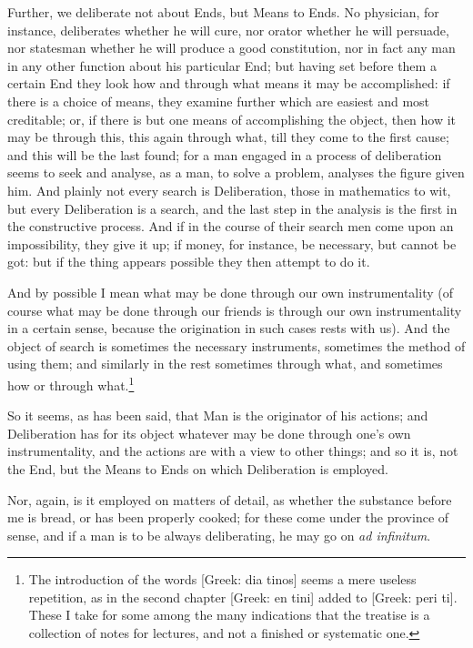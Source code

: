 Further, we deliberate not about Ends, but Means to Ends. No physician, for
instance, deliberates whether he will cure, nor orator whether he will
persuade, nor statesman whether he will produce a good constitution, nor in
fact any man in any other function about his particular End; but having set
before them a certain End they look how and through what means it may be
accomplished: if there is a choice of means, they examine further which are
easiest and most creditable; or, if there is but one means of accomplishing the
object, then how it may be through this, this again through what, till they
come to the first cause; and this will be the last found; for a man engaged in
a process of deliberation seems to seek and analyse, as a man, to solve a
problem, analyses the figure given him. And plainly not every search is
Deliberation, those in mathematics to wit, but every Deliberation is a search,
and the last step in the analysis is the first in the constructive process. And
if in the course of their search men come upon an impossibility, they give it
up; if money, for instance, be necessary, but cannot be got: but if the thing
appears possible they then attempt to do it.

And by possible I mean what may be done through our own instrumentality (of
course what may be done through our friends is through our own instrumentality
in a certain sense, because the origination in such cases rests with us). And
the object of search is sometimes the necessary instruments, sometimes the
method of using them; and similarly in the rest sometimes through what, and
sometimes how or through what.\footnote{The introduction of the words [Greek: dia tinos] seems a mere useless
repetition, as in the second chapter [Greek: en tini] added to [Greek: peri
ti]. These I take for some among the many indications that the treatise is a
collection of notes for lectures, and not a finished or systematic one.}

So it seems, as has been said, that Man is the originator of his actions; and
Deliberation has for its object whatever may be done through one’s own
instrumentality, and the actions are with a view to other things; and so it is,
not the End, but the Means to Ends on which Deliberation is employed.

Nor, again, is it employed on matters of detail, as whether the substance
before me is bread, or has been properly cooked; for these come under the
province of sense, and if a man is to be always deliberating, he may go on
\emph{ad infinitum}.


